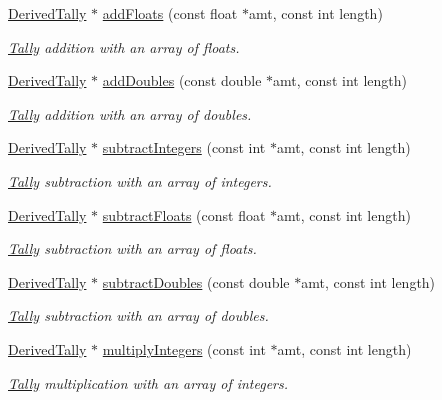 \begin{DoxyCompactItemize}
\hyperlink{classDerivedTally}{Derived\-Tally} $\ast$ \hyperlink{classTally_ad23d3e3db6184a558c6bad478084fb49}{add\-Floats} (const float $\ast$amt, const int length)
\begin{DoxyCompactList}\small\item\em \hyperlink{classTally}{Tally} addition with an array of floats. \end{DoxyCompactList}\item 
\hyperlink{classDerivedTally}{Derived\-Tally} $\ast$ \hyperlink{classTally_a21d2d7cbaf3e59c2612abf9f94168cfd}{add\-Doubles} (const double $\ast$amt, const int length)
\begin{DoxyCompactList}\small\item\em \hyperlink{classTally}{Tally} addition with an array of doubles. \end{DoxyCompactList}\item 
\hyperlink{classDerivedTally}{Derived\-Tally} $\ast$ \hyperlink{classTally_aebd2a26ce513bfde74ccbb97bee1635b}{subtract\-Integers} (const int $\ast$amt, const int length)
\begin{DoxyCompactList}\small\item\em \hyperlink{classTally}{Tally} subtraction with an array of integers. \end{DoxyCompactList}\item 
\hyperlink{classDerivedTally}{Derived\-Tally} $\ast$ \hyperlink{classTally_aaafa8791ea206e5da93082081b94abf5}{subtract\-Floats} (const float $\ast$amt, const int length)
\begin{DoxyCompactList}\small\item\em \hyperlink{classTally}{Tally} subtraction with an array of floats. \end{DoxyCompactList}\item 
\hyperlink{classDerivedTally}{Derived\-Tally} $\ast$ \hyperlink{classTally_ad6055bb7f1fc7dc711d6373511be9863}{subtract\-Doubles} (const double $\ast$amt, const int length)
\begin{DoxyCompactList}\small\item\em \hyperlink{classTally}{Tally} subtraction with an array of doubles. \end{DoxyCompactList}\item 
\hyperlink{classDerivedTally}{Derived\-Tally} $\ast$ \hyperlink{classTally_acd3f7c0344ef5878953eec7ff704100e}{multiply\-Integers} (const int $\ast$amt, const int length)
\begin{DoxyCompactList}\small\item\em \hyperlink{classTally}{Tally} multiplication with an array of integers. \end{DoxyCompactList}\item 

\end{DoxyCompactItemize}
